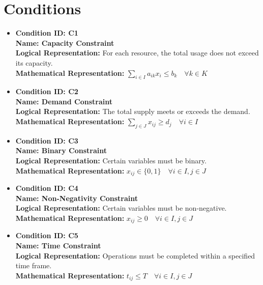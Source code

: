 \documentclass{article}
\begin{document}
\section{Conditions}
\begin{itemize}
    \item \textbf{Condition ID: C1} \\
          \textbf{Name: Capacity Constraint} \\
          \textbf{Logical Representation:} For each resource, the total usage does not exceed its capacity. \\
          \textbf{Mathematical Representation:} $\sum_{i \in I} a_{ik} x_{i} \leq b_k \quad \forall k \in K$

    \item \textbf{Condition ID: C2} \\
          \textbf{Name: Demand Constraint} \\
          \textbf{Logical Representation:} The total supply meets or exceeds the demand. \\
          \textbf{Mathematical Representation:} $\sum_{j \in J} x_{ij} \geq d_j \quad \forall i \in I$

    \item \textbf{Condition ID: C3} \\
          \textbf{Name: Binary Constraint} \\
          \textbf{Logical Representation:} Certain variables must be binary. \\
          \textbf{Mathematical Representation:} $x_{ij} \in \{0, 1\} \quad \forall i \in I, j \in J$

    \item \textbf{Condition ID: C4} \\
          \textbf{Name: Non-Negativity Constraint} \\
          \textbf{Logical Representation:} Certain variables must be non-negative. \\
          \textbf{Mathematical Representation:} $x_{ij} \geq 0 \quad \forall i \in I, j \in J$

    \item \textbf{Condition ID: C5} \\
          \textbf{Name: Time Constraint} \\
          \textbf{Logical Representation:} Operations must be completed within a specified time frame. \\
          \textbf{Mathematical Representation:} $t_{ij} \leq T \quad \forall i \in I, j \in J$
\end{itemize}
\end{document}
